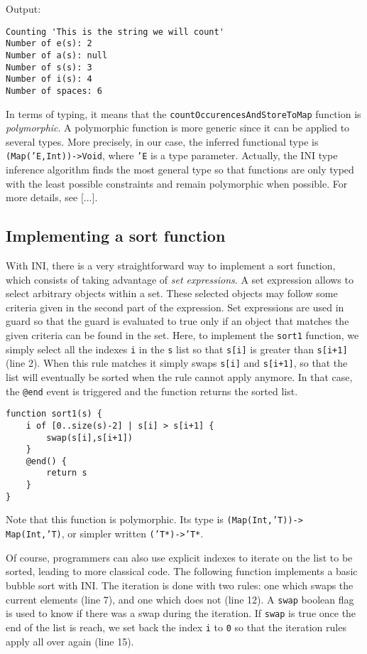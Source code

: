 \documentclass[11pt]{article}
\begin{document}
Output:

\begin{lstlisting}[numbers=none]
Counting 'This is the string we will count'
Number of e(s): 2
Number of a(s): null
Number of s(s): 3
Number of i(s): 4
Number of spaces: 6
\end{lstlisting}

In terms of typing, it means that the \texttt{countOccurencesAndStoreToMap} function is \emph{polymorphic}. A polymorphic function is more generic since it can be applied to several types. More precisely, in our case, the inferred functional type is \texttt{(Map('E,Int))->Void}, where \texttt{'E} is a type parameter. Actually, the INI type inference algorithm finds the most general type so that functions are only typed with the least possible constraints and remain polymorphic when possible. For more details, see [...].

\subsection{Implementing a sort function\label{sec:implementing_a_sort_function}}

With INI, there is a very straightforward way to implement a sort function, which consists of taking advantage of \emph{set expressions}. A set expression allows to select arbitrary objects within a set. These selected objects may follow some criteria given in the second part of the expression. Set expressions are used in guard so that the guard is evaluated to true only if an object that matches the given criteria can be found in the set. Here, to implement the \texttt{sort1} function, we simply select all the indexes \texttt{i} in the \texttt{s} list so that \texttt{s[i]} is greater than \texttt{s[i+1]} (line 2). When this rule matches it simply swaps \texttt{s[i]} and \texttt{s[i+1]}, so that the list will eventually be sorted when the rule cannot apply anymore. In that case, the \texttt{@end} event is triggered and the function returns the sorted list.

\begin{lstlisting}
function sort1(s) {
	i of [0..size(s)-2] | s[i] > s[i+1] {
		swap(s[i],s[i+1])
	}
	@end() {
		return s
	}
}
\end{lstlisting}

Note that this function is polymorphic. Its type is \texttt{(Map(Int,'T))->} \texttt{Map(Int,'T)}, or simpler written \texttt{('T*)->'T*}.

Of course, programmers can also use explicit indexes to iterate on the list to be sorted, leading to more classical code. The following function implements a basic bubble sort with INI. The iteration is done with two rules: one which swaps the current elements (line 7), and one which does not (line 12). A \texttt{swap} boolean flag is used to know if there was a swap during the iteration. If \texttt{swap} is true once the end of the list is reach, we set back the index \texttt{i} to \texttt{0} so that the iteration rules apply all over again (line 15).
\end{document}
